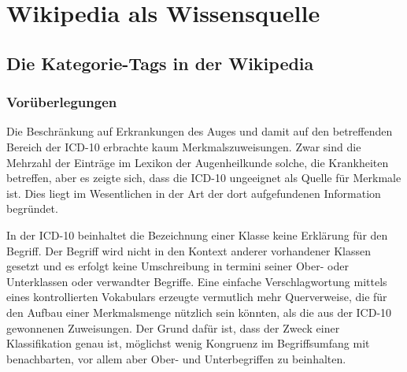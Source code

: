 \documentclass[pagesize,DIV=calc,12pt,draft]{scrreprt}
\begin{document}
\section{Wikipedia als Wissensquelle}

\subsection{Die Kategorie-Tags in der Wikipedia}

\subsubsection{Vorüberlegungen}
Die Beschränkung auf Erkrankungen des Auges und damit auf den betreffenden Bereich der ICD-10 erbrachte kaum Merkmalszuweisungen.
Zwar sind die Mehrzahl der Einträge im Lexikon der Augenheilkunde solche, die Krankheiten betreffen, aber es zeigte sich, dass die ICD-10 ungeeignet als Quelle für Merkmale ist. 
Dies liegt im Wesentlichen in der Art der dort aufgefundenen Information begründet. 

In der ICD-10 beinhaltet die Bezeichnung einer Klasse keine Erklärung für den Begriff. 
Der Begriff wird nicht in den Kontext anderer vorhandener Klassen gesetzt und es erfolgt keine Umschreibung in termini seiner Ober- oder Unterklassen oder verwandter Begriffe. 
Eine einfache Verschlagwortung mittels eines kontrollierten Vokabulars erzeugte vermutlich mehr Querverweise, die für den Aufbau einer Merkmalsmenge nützlich sein könnten, als die aus der ICD-10 gewonnenen Zuweisungen. 
Der Grund dafür ist, dass der Zweck einer Klassifikation genau ist, möglichst wenig Kongruenz im Begriffsumfang mit benachbarten, vor allem aber Ober- und Unterbegriffen zu beinhalten. 
\end{document}
